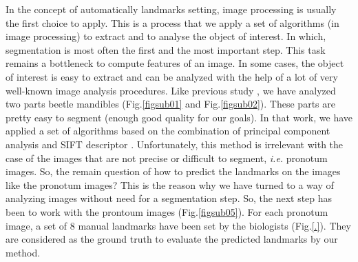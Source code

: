 \documentclass{article} %
\begin{document}
\begin{multicols}{2}
In the concept of automatically landmarks setting, image processing is usually the first choice to apply. This is a process that we apply a set of algorithms (in image processing) to extract and to analyse the object of interest. In which, segmentation is most often the first and the most important step. This task remains a bottleneck to compute features of an image. In some cases, the object of interest is easy to extract and can be analyzed with the help of a lot of very well-known image analysis procedures. Like previous study \cite{.}, we have analyzed two parts beetle mandibles (Fig.\ref{figsub01} and Fig.\ref{figsub02}). These parts are pretty easy to segment (enough good quality for our goals). In that work, we have applied a set of algorithms based on the combination of principal component analysis \cite{shlens2014tutorial} and SIFT descriptor \cite{lowe2004distinctive}. 
Unfortunately, this method is irrelevant with the case of the images that are not precise or difficult to segment, \textit{i.e.} pronotum images. So, the remain question of how to predict the landmarks on the images like the pronotum images? This is the reason why we have turned to a way of analyzing images without need for a segmentation step. So, the next step has been to work with the prontoum images (Fig.\ref{figsub05}). For each pronotum image, a set of 8 manual landmarks have been set by the biologists (Fig.\ref{.}). They are considered as the ground truth to evaluate the predicted landmarks by our method.


\end{multicols}
\end{document}
